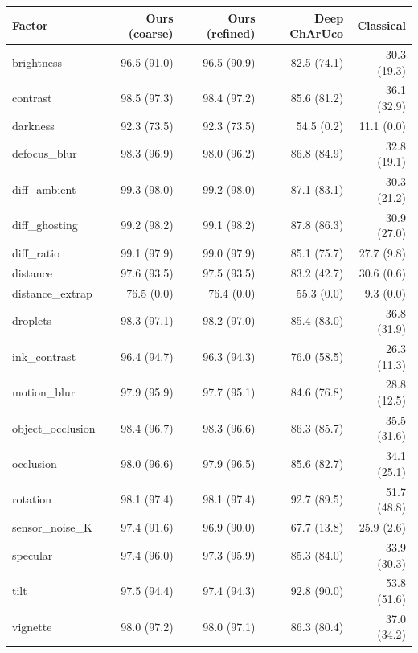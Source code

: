 \begin{tabular}{lrrrr}
\hline
Factor & Ours (coarse) & Ours (refined) & Deep ChArUco & Classical \\
\hline
brightness & 96.5 (91.0) & 96.5 (90.9) & 82.5 (74.1) & 30.3 (19.3) \\
contrast & 98.5 (97.3) & 98.4 (97.2) & 85.6 (81.2) & 36.1 (32.9) \\
darkness & 92.3 (73.5) & 92.3 (73.5) & 54.5 (0.2) & 11.1 (0.0) \\
defocus\_blur & 98.3 (96.9) & 98.0 (96.2) & 86.8 (84.9) & 32.8 (19.1) \\
diff\_ambient & 99.3 (98.0) & 99.2 (98.0) & 87.1 (83.1) & 30.3 (21.2) \\
diff\_ghosting & 99.2 (98.2) & 99.1 (98.2) & 87.8 (86.3) & 30.9 (27.0) \\
diff\_ratio & 99.1 (97.9) & 99.0 (97.9) & 85.1 (75.7) & 27.7 (9.8) \\
distance & 97.6 (93.5) & 97.5 (93.5) & 83.2 (42.7) & 30.6 (0.6) \\
distance\_extrap & 76.5 (0.0) & 76.4 (0.0) & 55.3 (0.0) & 9.3 (0.0) \\
droplets & 98.3 (97.1) & 98.2 (97.0) & 85.4 (83.0) & 36.8 (31.9) \\
ink\_contrast & 96.4 (94.7) & 96.3 (94.3) & 76.0 (58.5) & 26.3 (11.3) \\
motion\_blur & 97.9 (95.9) & 97.7 (95.1) & 84.6 (76.8) & 28.8 (12.5) \\
object\_occlusion & 98.4 (96.7) & 98.3 (96.6) & 86.3 (85.7) & 35.5 (31.6) \\
occlusion & 98.0 (96.6) & 97.9 (96.5) & 85.6 (82.7) & 34.1 (25.1) \\
rotation & 98.1 (97.4) & 98.1 (97.4) & 92.7 (89.5) & 51.7 (48.8) \\
sensor\_noise\_K & 97.4 (91.6) & 96.9 (90.0) & 67.7 (13.8) & 25.9 (2.6) \\
specular & 97.4 (96.0) & 97.3 (95.9) & 85.3 (84.0) & 33.9 (30.3) \\
tilt & 97.5 (94.4) & 97.4 (94.3) & 92.8 (90.0) & 53.8 (51.6) \\
vignette & 98.0 (97.2) & 98.0 (97.1) & 86.3 (80.4) & 37.0 (34.2) \\
\hline
\end{tabular}
